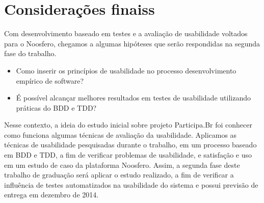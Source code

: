 \section{Considerações finaiss}
\label{sec:consideracoes-finais}

Com desenvolvimento baseado em testes e a avaliação de usabilidade voltados para o Noosfero, chegamos a algumas hipóteses que serão respondidas na segunda fase do trabalho.

\begin{itemize}
\item Como inserir os princípios de usabilidade no processo desenvolvimento empírico de software?
\item É possível alcançar melhores resultados em testes de usabilidade utilizando práticas do BDD e TDD?
\end{itemize}

Nesse contexto, a ideia do estudo inicial sobre projeto Participa.Br foi conhecer como funciona algumas técnicas de avaliação da usabilidade.
%
Aplicamos as técnicas de usabilidade pesquisadas durante o trabalho, em um processo baseado em BDD e TDD, a fim de verificar problemas de usabilidade, e satisfação e uso em um estudo de caso da plataforma Noosfero. 
%
Assim, a segunda fase deste trabalho de graduação será aplicar o estudo realizado, a fim de verificar a influência de testes automatizados na usabilidade do sistema e possui previsão de entrega em dezembro de 2014. 
